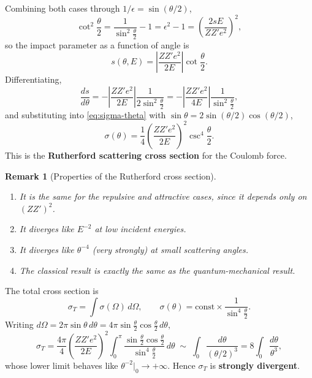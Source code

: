 \documentclass[11pt]{article}
\newtheorem{remark}{Remark}
\begin{document}
Combining both cases through $1/\epsilon = \sin(\theta/2)$,
\begin{equation}
  \cot^2\frac{\theta}{2}
  = \frac{1}{\sin^2\frac{\theta}{2}} - 1
  = \epsilon^2 - 1
  = \left(\frac{2sE}{ZZ'e^2}\right)^2,
\end{equation}
so the impact parameter as a function of angle is
\begin{equation}
  s(\theta,E) = \left\lvert\frac{ZZ'e^2}{2E}\right\rvert\cot\frac{\theta}{2}.
\end{equation}
Differentiating,
\begin{equation}
  \frac{ds}{d\theta}
  = -\left\lvert\frac{ZZ'e^2}{2E}\right\rvert\frac{1}{2\sin^2\frac{\theta}{2}}
  = -\left\lvert\frac{ZZ'e^2}{4E}\right\rvert\frac{1}{\sin^2\frac{\theta}{2}},
\end{equation}
and substituting into \eqref{eq:sigma-theta} with $\sin\theta = 2\sin(\theta/2)\cos(\theta/2)$,
\begin{equation}
  \sigma(\theta) = \frac{1}{4}\left(\frac{ZZ'e^2}{2E}\right)^2
  \csc^4\frac{\theta}{2}.
  \label{eq:rutherford}
\end{equation}
This is the \textbf{Rutherford scattering cross section} for the Coulomb force.

\begin{remark}[Properties of the Rutherford cross section]
\begin{enumerate}
  \item It is the same for the repulsive and attractive cases, since it depends only on
  $(ZZ')^2$.
  \item It diverges like $E^{-2}$ at low incident energies.
  \item It diverges like $\theta^{-4}$ (very strongly) at small scattering angles.
  \item The classical result is exactly the same as the quantum-mechanical result.
\end{enumerate}
\end{remark}

The total cross section is
\begin{equation}
  \sigma_T = \int \sigma(\Omega)\,d\Omega,
  \qquad \sigma(\theta) = \text{const}\times\frac{1}{\sin^4\frac{\theta}{2}}.
\end{equation}
Writing $d\Omega = 2\pi\sin\theta\,d\theta = 4\pi\sin\frac{\theta}{2}\cos\frac{\theta}{2}\,d\theta$,
\begin{equation}
  \sigma_T = \frac{4\pi}{4}\left(\frac{ZZ'e^2}{2E}\right)^2
  \int_0^{\pi}\frac{\sin\frac{\theta}{2}\cos\frac{\theta}{2}}{\sin^4\frac{\theta}{2}}\,d\theta
  \;\sim\; \int_0 \frac{d\theta}{(\theta/2)^3}
  = 8\int_0 \frac{d\theta}{\theta^3},
\end{equation}
whose lower limit behaves like $\theta^{-2}\big|_0 \to +\infty$. Hence $\sigma_T$ is
\textbf{strongly divergent}.
\end{document}
